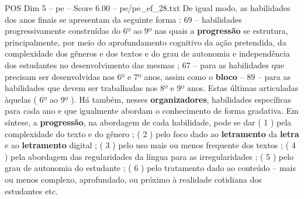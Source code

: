 \begin{textsample}{POS Dim 5 – pe – Score 6.00 – pe/pe\_ef\_28.txt}
De igual modo, as habilidades dos anos finais se apresentam da seguinte forma : 69 – habilidades progressivamente construídas do 6º ao 9º nas quais a \textbf{progressão} se estrutura, principalmente, por meio do aprofundamento cognitivo da ação pretendida, da complexidade dos gêneros e dos textos e do grau de autonomia e independência dos estudantes no desenvolvimento das mesmas ; 67 – para as habilidades que precisam ser desenvolvidas nos 6º e 7º anos, assim como o \textbf{bloco} – 89 – para as habilidades que devem ser trabalhadas nos 8º e 9º anos.
Estas últimas articuladas àquelas ( 6º ao 9º ).
Há também, nesses \textbf{organizadores}, habilidades específicas para cada ano e que igualmente abordam o conhecimento de forma gradativa.
Em síntese, a \textbf{progressão}, na abordagem de cada habilidade, pode se dar ( 1 ) pela complexidade do texto e do gênero ; ( 2 ) pelo foco dado ao \textbf{letramento} da \textbf{letra} e ao \textbf{letramento} digital ; ( 3 ) pelo uso mais ou menos frequente dos textos ; ( 4 ) pela abordagem das regularidades da língua para as irregularidades ; ( 5 ) pelo grau de autonomia do estudante ; ( 6 ) pelo tratamento dado ao conteúdo – mais ou menos complexo, aprofundado, ou próximo à realidade cotidiana dos estudantes etc.

\end{textsample}
